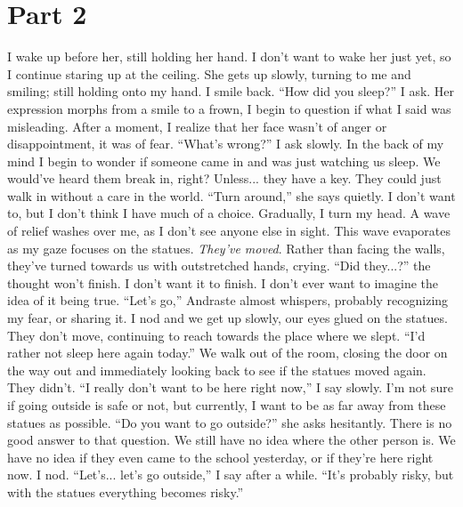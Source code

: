 \documentclass[a4paper, 12pt]{book}
\newcommand\tab[1][1cm]{\hspace*{#1}}
\begin{document}
\section*{Part 2}
\tab
I wake up before her, still holding her hand. I don’t want to wake her just yet, so I continue staring up at the ceiling. She gets up slowly, turning to me and smiling; still holding onto my hand. I smile back. ``How did you sleep?'' I ask. Her expression morphs from a smile to a frown, I begin to question if what I said was misleading. After a moment, I realize that her face wasn’t of anger or disappointment, it was of fear. ``What’s wrong?'' I ask slowly. In the back of my mind I begin to wonder if someone came in and was just watching us sleep. We would’ve heard them break in, right? Unless... they have a key. They could just walk in without a care in the world.
\newline
\tab
``Turn around,'' she says quietly. I don’t want to, but I don’t think I have much of a choice.
\newline
\tab
Gradually, I turn my head. A wave of relief washes over me, as I don’t see anyone else in sight. This wave evaporates as my gaze focuses on the statues. \textit{They’ve moved}. Rather than facing the walls, they’ve turned towards us with outstretched hands, crying. ``Did they...?'' the thought won’t finish. I don’t want it to finish. I don’t ever want to imagine the idea of it being true.
\newline
\tab
``Let’s go,'' Andraste almost whispers, probably recognizing my fear, or sharing it. I nod and we get up slowly, our eyes glued on the statues. They don’t move, continuing to reach towards the place where we slept. ``I’d rather not sleep here again today.''
\newline
\tab
We walk out of the room, closing the door on the way out and immediately looking back to see if the statues moved again. They didn’t. ``I really don’t want to be here right now,'' I say slowly. I’m not sure if going outside is safe or not, but currently, I want to be as far away from these statues as possible.
\newline
\tab
``Do you want to go outside?'' she asks hesitantly.  There is no good answer to that question. We still have no idea where the other person is. We have no idea if they even came to the school yesterday, or if they’re here right now.
\newline
\tab
I nod. ``Let’s... let’s go outside,'' I say after a while. ``It’s probably risky, but with the statues everything becomes risky.''
\end{document}
